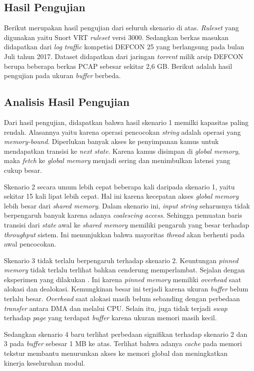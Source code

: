     

  \subsection{Hasil Pengujian}

    Berikut merupakan hasil pengujian dari seluruh skenario di atas. \emph{Ruleset} yang digunakan yaitu Snort VRT \emph{ruleset} versi 3000. Sedangkan berkas masukan didapatkan dari \emph{log traffic} kompetisi DEFCON 25 yang berlangsung pada bulan Juli tahun 2017. Dataset didapatkan dari jaringan \emph{torrent} milik arsip DEFCON berupa beberapa berkas PCAP sebesar sekitar 2,6 GB. Berikut adalah hasil pengujian pada ukuran \emph{buffer} berbeda.\clearpage

      

  \subsection{Analisis Hasil Pengujian}
    
    Dari hasil pengujian, didapatkan bahwa hasil skenario 1 memilki kapasitas paling rendah. Alasannya yaitu karena operasi pencocokan \emph{string} adalah operasi yang \emph{memory-bound}. Diperlukan banyak akses ke penyimpanan kamus untuk mendapatkan transisi ke \emph{next state}. Karena kamus disimpan di \emph{global memory}, maka \emph{fetch} ke \emph{global memory} menjadi sering dan menimbulkan latensi yang cukup besar.
    
    Skenario 2 secara umum lebih cepat beberapa kali daripada skenario 1, yaitu sekitar 15 kali lipat lebih cepat. Hal ini karena kecepatan akses \emph{global memory} lebih besar dari \emph{shared memory}. Dalam skenario ini, \emph{input string} seharusnya tidak berpengaruh banyak karena adanya \emph{coalescing access}. Sehingga pemuatan baris transisi dari \emph{state} awal ke \emph{shared memory} memiliki pengaruh yang besar terhadap \emph{throughput} sistem. Ini menunjukkan bahwa mayoritas \emph{thread} akan berhenti pada awal pencocokan.

    Skenario 3 tidak terlalu berpengaruh terhadap skenario 2. Keuntungan \emph{pinned memory} tidak terlalu terlihat bahkan cenderung memperlambat. Sejalan dengan eksperimen yang dilakukan \cite{gnort2008}. Ini karena \emph{pinned memory} memiliki \emph{overhead} saat alokasi dan dealokasi. Kemungkinan besar ini terjadi karena ukuran \emph{buffer} belum terlalu besar. \emph{Overhead} saat alokasi masih belum sebanding dengan perbedaan \emph{transfer} antara DMA dan melalui CPU. Selain itu, juga tidak terjadi \emph{swap} terhadap \emph{page} yang terdapat \emph{buffer} karena ukuran memori masih kecil.

    Sedangkan skenario 4 baru terlihat perbedaan signifikan terhadap skenario 2 dan 3 pada \emph{buffer} sebesar 1 MB ke atas. Terlihat bahwa adanya \emph{cache} pada memori tekstur membantu menurunkan akses ke memori global dan meningkatkan kinerja keseluruhan modul. 